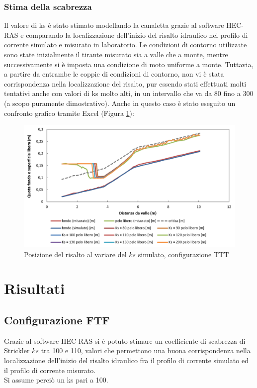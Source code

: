 \documentclass[12pt]{article} %
\begin{document}
\subsubsection{Stima della scabrezza}
\noindent Il valore di ks è stato stimato modellando la canaletta grazie al software HEC-RAS e comparando la localizzazione dell’inizio del risalto idraulico nel profilo di corrente simulato e misurato in laboratorio. Le condizioni di contorno utilizzate sono state inizialmente il tirante misurato sia a valle che a monte, mentre successivamente si è imposta una condizione di moto uniforme a monte. Tuttavia, a partire da entrambe le coppie di condizioni di contorno, non vi è stata corrispondenza nella localizzazione del risalto, pur essendo stati effettuati molti tentativi anche con valori di ks molto alti, in un intervallo che va da 80 fino a 300 (a scopo puramente dimostrativo). Anche in questo caso è stato eseguito un confronto grafico tramite Excel (Figura \ref{fig:risalto_TTT}):

\begin{figure}[H]
    \centering
    \includegraphics[width=\textwidth]{TTTrisalto6.5.png}
    \caption{Posizione del risalto al variare del $ks$ simulato, configurazione TTT}
    \label{fig:risalto_TTT}
\end{figure}
\newpage
\section{Risultati}
\subsection{Configurazione FTF}
\noindent Grazie al software HEC-RAS si è potuto stimare un coefficiente di scabrezza di Strickler $ks$ tra 100 e 110, valori che permettono una buona corrispondenza nella localizzazione dell’inizio del risalto idraulico fra il profilo di corrente simulato ed il profilo di corrente misurato. \\
Si assume perciò un ks pari a 100.
\end{document}
